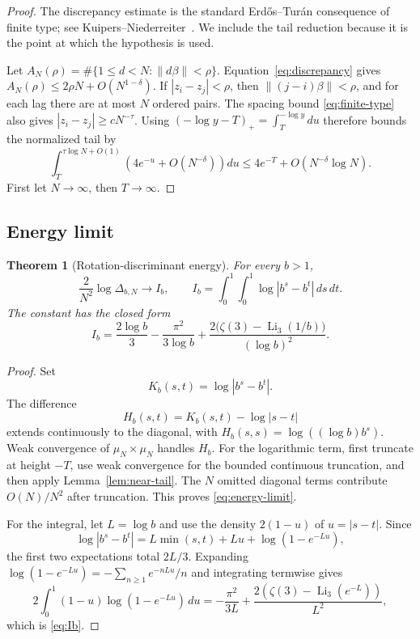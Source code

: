 \documentclass[11pt,oneside]{article}
\newtheorem{theorem}{Theorem}[section]
\theoremstyle{definition}
\theoremstyle{remark}
\newcommand{\norm}[1]{\left\lVert #1\right\rVert}
\newcommand{\Li}{\operatorname{Li}}
\begin{document}
\begin{proof}
The discrepancy estimate is the standard Erd\H{o}s--Tur\'an consequence of finite type; see
Kuipers--Niederreiter~\cite{KuipersNiederreiter}.  We include the tail reduction because it is
the point at which the hypothesis is used.

Let $A_N(\rho)=\#\{1\le d<N:\norm{d\beta}<\rho\}$.  Equation~\eqref{eq:discrepancy} gives
$A_N(\rho)\le2\rho N+O(N^{1-\delta})$.  If $|z_i-z_j|<\rho$, then
$\norm{(j-i)\beta}<\rho$, and for each lag there are at most $N$ ordered pairs.  The spacing
bound \eqref{eq:finite-type} also gives $|z_i-z_j|\ge cN^{-\tau}$.  Using
$(-\log y-T)_+=\int_T^{-\log y}du$ therefore bounds the normalized tail by
\[
 \int_T^{\tau\log N+O(1)}
 \left(4e^{-u}+O(N^{-\delta})\right)du
 \le4e^{-T}+O(N^{-\delta}\log N).
\]
First let $N\to\infty$, then $T\to\infty$.
\end{proof}

\subsection{Energy limit}

\begin{theorem}[Rotation-discriminant energy]
\label{thm:energy-limit}
For every $b>1$,
\begin{equation}
 \frac{2}{N^2}\log\Delta_{b,N}\longrightarrow I_b,
 \qquad
 I_b=\int_0^1\!\int_0^1\log|b^s-b^t|\,ds\,dt.
 \label{eq:energy-limit}
\end{equation}
The constant has the closed form
\begin{equation}
 I_b=\frac{2\log b}{3}
 -\frac{\pi^2}{3\log b}
 +\frac{2\bigl(\zeta(3)-\Li_3(1/b)\bigr)}{(\log b)^2}.
 \label{eq:Ib}
\end{equation}
\end{theorem}

\begin{proof}
Set
\[
 K_b(s,t)=\log|b^s-b^t|.
\]
The difference
\[
 H_b(s,t)=K_b(s,t)-\log|s-t|
\]
extends continuously to the diagonal, with
$H_b(s,s)=\log((\log b)b^s)$.  Weak convergence of $\mu_N\times\mu_N$ handles $H_b$.  For the
logarithmic term, first truncate at height $-T$, use weak convergence for the bounded continuous
truncation, and then apply Lemma~\ref{lem:near-tail}.  The $N$ omitted diagonal terms contribute
$O(N)/N^2$ after truncation.  This proves \eqref{eq:energy-limit}.

For the integral, let $L=\log b$ and use the density $2(1-u)$ of $u=|s-t|$.  Since
\[
 \log|b^s-b^t|=L\min(s,t)+Lu+\log(1-e^{-Lu}),
\]
the first two expectations total $2L/3$.  Expanding
$\log(1-e^{-Lu})=-\sum_{n\ge1}e^{-nLu}/n$ and integrating termwise gives
\[
 2\int_0^1(1-u)\log(1-e^{-Lu})\,du
 =-\frac{\pi^2}{3L}
 +\frac{2(\zeta(3)-\Li_3(e^{-L}))}{L^2},
\]
which is \eqref{eq:Ib}.
\end{proof}
\end{document}

